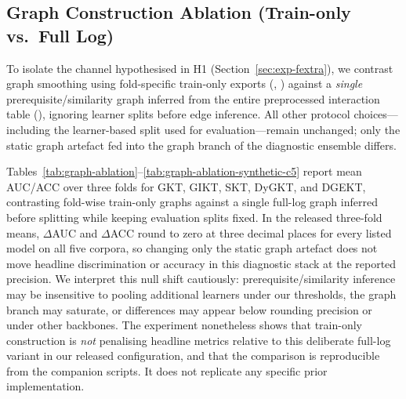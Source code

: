 \subsection{Graph Construction Ablation (Train-only vs.\ Full Log)}
\label{sec:exp-graph-ablation}
To isolate the channel hypothesised in H1 (Section~\ref{sec:exp-fextra}),
we contrast graph smoothing using fold-specific train-only exports
(, ) against a
\emph{single} prerequisite/similarity graph inferred from the entire
preprocessed interaction table (),
ignoring learner splits before edge inference.
All other protocol choices---including the learner-based split used for
evaluation---remain unchanged; only the static graph artefact fed into the
graph branch of the diagnostic ensemble differs.

Tables~\ref{tab:graph-ablation}--\ref{tab:graph-ablation-synthetic-c5} report mean AUC/ACC over three folds for
GKT, GIKT, SKT, DyGKT, and DGEKT, contrasting fold-wise train-only graphs against a single
full-log graph inferred before splitting while keeping evaluation splits fixed.
In the released three-fold means, $\Delta$AUC and $\Delta$ACC round to zero at
three decimal places for every listed model on all five corpora, so changing only
the static graph artefact does not move headline discrimination or accuracy in
this diagnostic stack at the reported precision.
We interpret this null shift cautiously: prerequisite/similarity inference may be
insensitive to pooling additional learners under our thresholds, the graph branch
may saturate, or differences may appear below rounding precision or under other
backbones.
The experiment nonetheless shows that train-only construction is \emph{not}
penalising headline metrics relative to this deliberate full-log variant in our
released configuration, and that the comparison is reproducible from the
companion scripts. It does not replicate any specific prior implementation.

